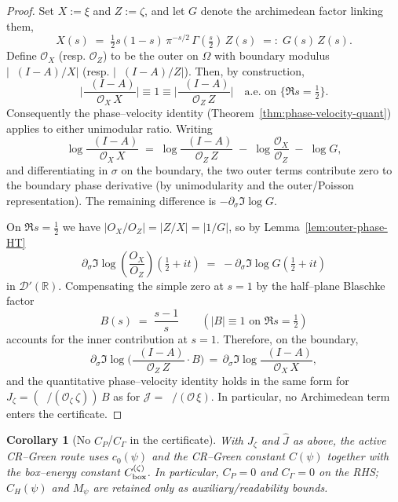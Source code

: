 \documentclass[11pt]{article}
\newtheorem{corollary}[theorem]{Corollary}
\theoremstyle{definition}
\theoremstyle{remark}
\DeclareMathOperator{\dettwo}{det_2}
\begin{document}
\begin{proof}
Set $X:=\xi$ and $Z:=\zeta$, and let $G$ denote the archimedean factor linking them,
\[
  X(s)\;=\;\tfrac12 s(1{-}s)\,\pi^{-s/2}\,\Gamma(\tfrac s2)\,Z(s)\;=:\;G(s)\,Z(s).
\]
Define $\mathcal O_X$ (resp. $\mathcal O_Z$) to be the outer on $\Omega$ with boundary modulus $\big|\dettwo(I{-}A)/X\big|$ (resp. $\big|\dettwo(I{-}A)/Z\big|$). Then, by construction,
\[
  \Big|\frac{\dettwo(I{-}A)}{\mathcal O_X\,X}\Big|\equiv 1\equiv \Big|\frac{\dettwo(I{-}A)}{\mathcal O_Z\,Z}\Big|\quad \text{a.e. on }\{\Re s=\tfrac12\}.
\]
Consequently the phase–velocity identity (Theorem~\ref{thm:phase-velocity-quant}) applies to either unimodular ratio. Writing
\[
  \log \frac{\dettwo(I{-}A)}{\mathcal O_X\,X}
  \;=\; \log \frac{\dettwo(I{-}A)}{\mathcal O_Z\,Z}\; -\; \log\frac{\mathcal O_X}{\mathcal O_Z}\; -\; \log G,
\]
and differentiating in $\sigma$ on the boundary, the two outer terms contribute zero to the boundary phase derivative (by unimodularity and the outer/Poisson representation). The remaining difference is $-\partial_\sigma\Im\log G$.

On $\Re s=\tfrac12$ we have $|O_X/O_Z|=|Z/X|=|1/G|$, so by Lemma~\ref{lem:outer-phase-HT}
\[
  \partial_\sigma\Im\log\!\left(\frac{O_X}{O_Z}\right)(\tfrac12+it)\;=\;-\partial_\sigma\Im\log G(\tfrac12+it)
\]
in $\mathcal D'(\mathbb R)$. Compensating the simple zero at $s=1$ by the half–plane Blaschke factor
\[
  B(s)\;=\;\frac{s-1}{s}\qquad(|B|\equiv 1\text{ on }\Re s=\tfrac12)
\]
accounts for the inner contribution at $s=1$. Therefore, on the boundary,
\[
  \partial_\sigma\Im\log\!\Big(\frac{\dettwo(I{-}A)}{\mathcal O_Z\,Z}\cdot B\Big)
  \,=\, \partial_\sigma\Im\log\frac{\dettwo(I{-}A)}{\mathcal O_X\,X},
\]
and the quantitative phase–velocity identity holds in the same form for $J_\zeta=(\dettwo/(\mathcal O_\zeta\,\zeta))\,B$ as for $\mathcal J=\dettwo/(\mathcal O\,\xi)$. In particular, no Archimedean term enters the certificate.
\end{proof}


\begin{corollary}[No $C_P$/$C_\Gamma$ in the certificate]
With $J_\zeta$ and $\widehat J$ as above, the active CR–Green route uses $c_0(\psi)$ and the CR–Green constant $C(\psi)$ together with the box–energy constant $C_{\rm box}^{(\zeta)}$. In particular, $C_P=0$ and $C_\Gamma=0$ on the RHS; $C_H(\psi)$ and $M_\psi$ are retained only as auxiliary/readability bounds.
\end{corollary}
\end{document}
